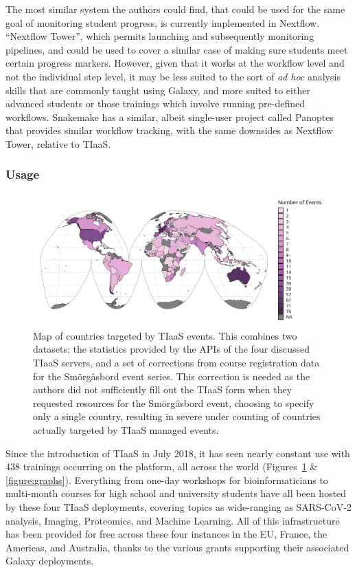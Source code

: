 \documentclass[a4paper,num-refs]{oup-contemporary}
\begin{document}
The most similar system the authors could find, that could be used for the same goal of monitoring student progress, is currently implemented in Nextflow. ``Nextflow Tower''\cite{nf-tower}, which permits launching and subsequently monitoring pipelines, and could be used to cover a similar case of making sure students meet certain progress markers. However, given that it works at the workflow level and not the individual step level, it may be less suited to the sort of \textit{ad hoc} analysis skills that are commonly taught using Galaxy, and more suited to either advanced students or those trainings which involve running pre-defined workflows. Snakemake has a similar, albeit single-user project called Panoptes that provides similar workflow tracking\cite{panoptes}, with the same downsides as Nextflow Tower, relative to TIaaS.

\subsubsection{Usage}

\begin{figure}[bt!]
\centering
	\includegraphics[width=\linewidth]{images/map.png}
	\caption{Map of countries targeted by TIaaS events. This combines two datasets: the statistics provided by the APIs of the four discussed TIaaS servers, and a set of corrections from course registration data for the Smörgåsbord event series. This correction is needed as the authors did not sufficiently fill out the TIaaS form when they requested resources for the Smörgåsbord event, choosing to specify only a single country, resulting in severe under counting of countries actually targeted by TIaaS managed events.}\label{figure:map}
\end{figure}

Since the introduction of TIaaS in July 2018, it has seen nearly constant use with 438 trainings occurring on the platform, all across the world (Figures~\ref{figure:map} \& \ref{figure:graphs}).
Everything from one-day workshops for bioinformaticians to multi-month courses for high school and university students have all been hosted by these four TIaaS deployments, covering topics as wide-ranging as SARS-CoV-2 analysis, Imaging, Proteomics, and Machine Learning. All of this infrastructure has been provided for free across these four instances in the EU, France, the Americas, and Australia, thanks to the various grants supporting their associated Galaxy deployments.
\end{document}
